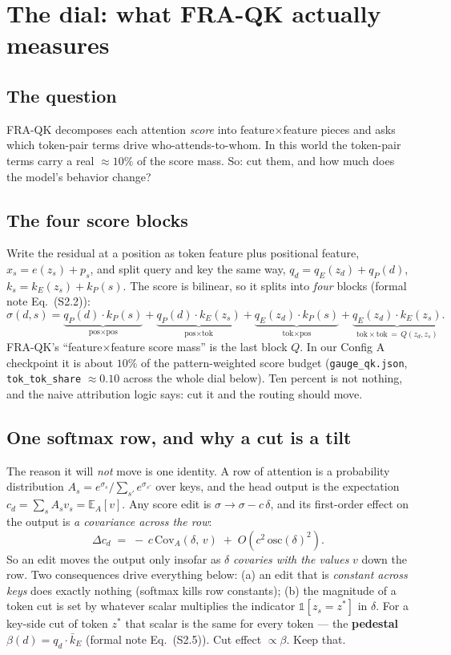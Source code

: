 \documentclass[11pt]{article}
\newcommand{\pE}{\mathbb{E}}
\newcommand{\pCov}{\mathrm{Cov}}
\begin{document}
\section{The dial: what FRA-QK actually measures}\label{sec:dial}

\subsection{The question}

FRA-QK decomposes each attention \emph{score} into feature$\times$feature
pieces and asks which token-pair terms drive who-attends-to-whom. In this
world the token-pair terms carry a real $\approx10\%$ of the score mass. So:
cut them, and how much does the model's behavior change?

\subsection{The four score blocks}

Write the residual at a position as token feature plus positional feature,
$x_s=e(z_s)+p_s$, and split query and key the same way,
$q_d=q_E(z_d)+q_P(d)$, $k_s=k_E(z_s)+k_P(s)$. The score is bilinear, so it
splits into \emph{four} blocks (formal note Eq.~(S2.2)):
\[
  \sigma(d,s)=
  \underbrace{q_P(d)\!\cdot\!k_P(s)}_{\text{pos}\times\text{pos}}
  +\underbrace{q_P(d)\!\cdot\!k_E(z_s)}_{\text{pos}\times\text{tok}}
  +\underbrace{q_E(z_d)\!\cdot\!k_P(s)}_{\text{tok}\times\text{pos}}
  +\underbrace{q_E(z_d)\!\cdot\!k_E(z_s)}_{\text{tok}\times\text{tok}\,=\,Q(z_d,z_s)}.
\]
FRA-QK's ``feature$\times$feature score mass'' is the last block $Q$. In our
Config A checkpoint it is about $10\%$ of the pattern-weighted score budget
(\texttt{gauge\_qk.json}, \texttt{tok\_tok\_share} $\approx 0.10$ across the
whole dial below). Ten percent is not nothing, and the naive attribution logic
says: cut it and the routing should move.

\subsection{One softmax row, and why a cut is a tilt}

The reason it will \emph{not} move is one identity. A row of attention is a
probability distribution $A_s=e^{\sigma_s}/\sum_{s'}e^{\sigma_{s'}}$ over keys,
and the head output is the expectation $c_d=\sum_s A_s v_s=\pE_A[v]$. Any score
edit is $\sigma\to\sigma-c\,\delta$, and its first-order effect on the output is
\emph{a covariance across the row}:
\[
  \Delta c_d \;=\; -\,c\,\pCov_A(\delta,\,v)\;+\;O(c^2\,\mathrm{osc}(\delta)^2).
\]
So an edit moves the output only insofar as $\delta$ \emph{covaries with the
values} $v$ down the row. Two consequences drive everything below: (a) an edit
that is \emph{constant across keys} does exactly nothing (softmax kills row
constants); (b) the magnitude of a token cut is set by whatever scalar
multiplies the indicator $\mathbb 1[z_s=z^*]$ in $\delta$. For a key-side cut of
token $z^*$ that scalar is the same for every token --- the \textbf{pedestal}
$\beta(d)=q_d\cdot\bar k_E$ (formal note Eq.~(S2.5)). Cut effect
$\propto\beta$. Keep that.
\end{document}
